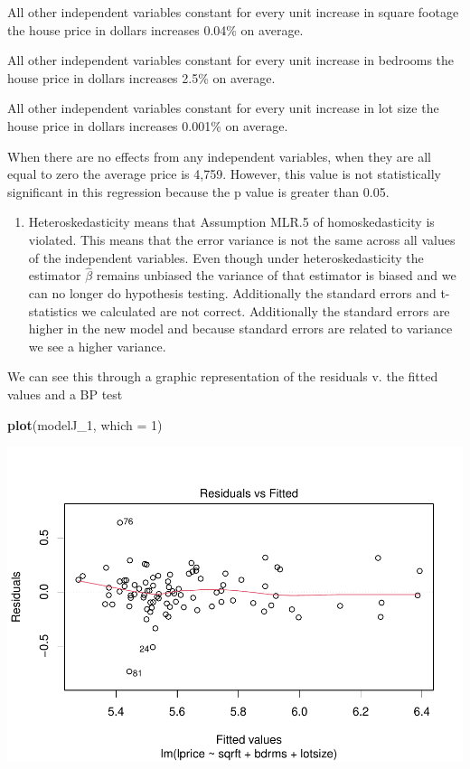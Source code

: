 \documentclass[
  12pt,
  landscape]{article}
\newenvironment{Shaded}{\begin{snugshade}}{\end{snugshade}}
\newcommand{\DataTypeTok}[1]{\textcolor[rgb]{0.13,0.29,0.53}{#1}}
\newcommand{\DecValTok}[1]{\textcolor[rgb]{0.00,0.00,0.81}{#1}}
\newcommand{\KeywordTok}[1]{\textcolor[rgb]{0.13,0.29,0.53}{\textbf{#1}}}
\newcommand{\NormalTok}[1]{#1}
\providecommand{\tightlist}{%
  \setlength{\itemsep}{0pt}\setlength{\parskip}{0pt}}
\begin{document}
All other independent variables constant for every unit increase in
square footage the house price in dollars increases 0.04\% on average.

All other independent variables constant for every unit increase in
bedrooms the house price in dollars increases 2.5\% on average.

All other independent variables constant for every unit increase in lot
size the house price in dollars increases 0.001\% on average.

When there are no effects from any independent variables, when they are
all equal to zero the average price is 4,759. However, this value is not
statistically significant in this regression because the p value is
greater than 0.05.

\begin{enumerate}
\def\labelenumi{(\alph{enumi})}
\setcounter{enumi}{10}
\tightlist
\item
  Heteroskedasticity means that Assumption MLR.5 of homoskedasticity is
  violated. This means that the error variance is not the same across
  all values of the independent variables. Even though under
  heteroskedasticity the estimator \(\hat\beta\) remains unbiased the
  variance of that estimator is biased and we can no longer do
  hypothesis testing. Additionally the standard errors and t-statistics
  we calculated are not correct. Additionally the standard errors are
  higher in the new model and because standard errors are related to
  variance we see a higher variance.
\end{enumerate}

We can see this through a graphic representation of the residuals v. the
fitted values and a BP test

\begin{Shaded}
\begin{Highlighting}[]
\KeywordTok{plot}\NormalTok{(modelJ_}\DecValTok{1}\NormalTok{, }\DataTypeTok{which =} \DecValTok{1}\NormalTok{)}
\end{Highlighting}
\end{Shaded}

\includegraphics{Ogle_MicroMetricsAssignment_2_Q1_files/figure-latex/unnamed-chunk-22-1.pdf}
\end{document}
